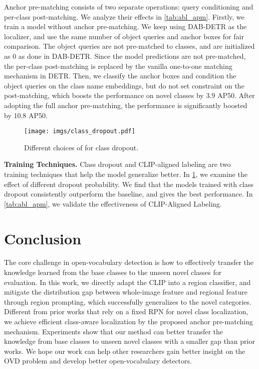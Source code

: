 \documentclass[10pt,twocolumn,letterpaper]{article}
\begin{document}
Anchor pre-matching consists of two separate operations: query conditioning and per-class post-matching.
We analyze their effects in \cref{tab:abl_apm}.
Firstly, we train a model without anchor pre-matching. We keep using DAB-DETR\cite{dabdetr} as the localizer, and use the same number of object queries and anchor boxes for fair comparison.
The object queries are not pre-matched to classes, and are initialized as 0 as done in DAB-DETR.
Since the model predictions are not pre-matched, the per-class post-matching is replaced by the vanilla one-to-one matching mechanism in DETR.
Then, we classify the anchor boxes and condition the object queries on the class name embeddings, but do not set constraint on the post-matching, which boosts the performance on novel classes by 3.9 AP50.
After adopting the full anchor pre-matching, the performance is significantly boosted by 10.8 AP50.


\begin{figure}
  \centering
    \hspace{0.cm}
    \texttt{[image: imgs/class\_dropout.pdf]}
    \vspace{-1.2cm}
  \caption{Different choices of  for class dropout. }
  \label{fig:class_dropout}
\end{figure}

\noindent\textbf{Training Techniques. }
Class dropout and CLIP-aligned labeling are two training techniques that help the model generalize better.
In \cref{fig:class_dropout}, we examine the effect of different dropout probability.
We find that the models trained with class dropout consistently outperform the baseline, and  gives the best performance.
In \cref{tab:abl_apm}, we validate the effectiveness of CLIP-Aligned Labeling.


\section{Conclusion}
The core challenge in open-vocabulary detection is how to effectively transfer the knowledge learned from the base classes to the unseen novel classes for evaluation.
In this work, we directly adapt the  CLIP into a region classifier, and mitigate the distribution gap between whole-image feature and regional feature through region prompting, which successfully generalizes to the novel categories.
Different from prior works that rely on a fixed RPN for novel class localization, we achieve efficient class-aware localization by the proposed anchor pre-matching mechanism.
Experiments show that our method can better transfer the knowledge from base classes to unseen novel classes with a smaller gap than prior works.
We hope our work can help other researchers gain better insight on the OVD problem and develop better open-vocabulary detectors.
\end{document}
